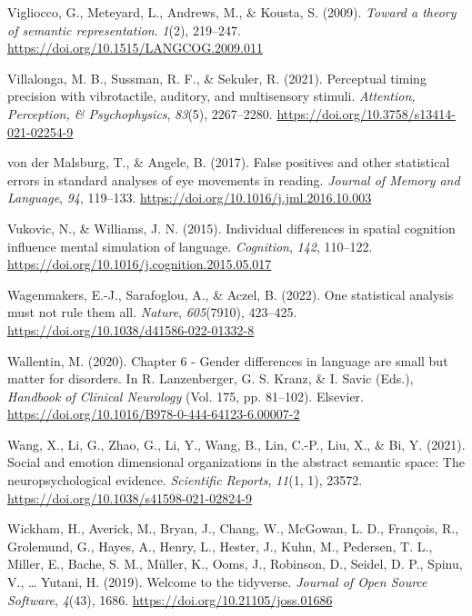 \documentclass[
  12pt,
  man,floatsintext]{apa7}
\newlength{\cslhangindent}
\newlength{\cslentryspacingunit} %
\newenvironment{CSLReferences}[2] %
 {%
  \setlength{\parindent}{0pt}
  \ifodd #1
  \let\oldpar\par
  \def\par{\hangindent=\cslhangindent\oldpar}
  \fi
  \setlength{\parskip}{#2\cslentryspacingunit}
 }%
 {}
\begin{document}
\begin{CSLReferences}{1}{0}
\leavevmode{}%
Vigliocco, G., Meteyard, L., Andrews, M., \& Kousta, S. (2009). \emph{Toward a theory of semantic representation}. \emph{1}(2), 219--247. \url{https://doi.org/10.1515/LANGCOG.2009.011}

\leavevmode{}%
Villalonga, M. B., Sussman, R. F., \& Sekuler, R. (2021). Perceptual timing precision with vibrotactile, auditory, and multisensory stimuli. \emph{Attention, Perception, \& Psychophysics}, \emph{83}(5), 2267--2280. \url{https://doi.org/10.3758/s13414-021-02254-9}

\leavevmode{}%
von der Malsburg, T., \& Angele, B. (2017). False positives and other statistical errors in standard analyses of eye movements in reading. \emph{Journal of Memory and Language}, \emph{94}, 119--133. \url{https://doi.org/10.1016/j.jml.2016.10.003}

\leavevmode{}%
Vukovic, N., \& Williams, J. N. (2015). Individual differences in spatial cognition influence mental simulation of language. \emph{Cognition}, \emph{142}, 110--122. \url{https://doi.org/10.1016/j.cognition.2015.05.017}

\leavevmode{}%
Wagenmakers, E.-J., Sarafoglou, A., \& Aczel, B. (2022). One statistical analysis must not rule them all. \emph{Nature}, \emph{605}(7910), 423--425. \url{https://doi.org/10.1038/d41586-022-01332-8}

\leavevmode{}%
Wallentin, M. (2020). Chapter 6 - {Gender} differences in language are small but matter for disorders. In R. Lanzenberger, G. S. Kranz, \& I. Savic (Eds.), \emph{Handbook of {Clinical Neurology}} (Vol. 175, pp. 81--102). {Elsevier}. \url{https://doi.org/10.1016/B978-0-444-64123-6.00007-2}

\leavevmode{}%
Wang, X., Li, G., Zhao, G., Li, Y., Wang, B., Lin, C.-P., Liu, X., \& Bi, Y. (2021). Social and emotion dimensional organizations in the abstract semantic space: The neuropsychological evidence. \emph{Scientific Reports}, \emph{11}(1, 1), 23572. \url{https://doi.org/10.1038/s41598-021-02824-9}

\leavevmode{}%
Wickham, H., Averick, M., Bryan, J., Chang, W., McGowan, L. D., François, R., Grolemund, G., Hayes, A., Henry, L., Hester, J., Kuhn, M., Pedersen, T. L., Miller, E., Bache, S. M., Müller, K., Ooms, J., Robinson, D., Seidel, D. P., Spinu, V., \ldots{} Yutani, H. (2019). Welcome to the {tidyverse}. \emph{Journal of Open Source Software}, \emph{4}(43), 1686. \url{https://doi.org/10.21105/joss.01686}


\end{CSLReferences}
\end{document}
